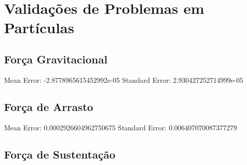 \section{\textbf{Validações de Problemas em Partículas}}
\subsection{\textbf{Força Gravitacional}}

Mean Error: -2.8778965615452992e-05
Standard Error: 2.930427252714999e-05
\subsection{\textbf{Força de Arrasto}}

Mean Error: 0.0002926604962750675
Standard Error: 0.006407070087377279
\subsection{\textbf{Força de Sustentação}}